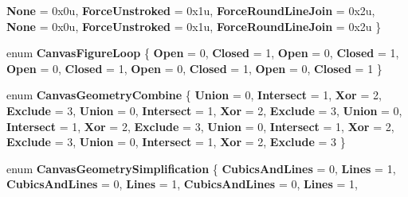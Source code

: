 \begin{DoxyCompactItemize}
{\bfseries None} = 0x0u, 
{\bfseries Force\+Unstroked} = 0x1u, 
{\bfseries Force\+Round\+Line\+Join} = 0x2u, 
\newline
{\bfseries None} = 0x0u, 
{\bfseries Force\+Unstroked} = 0x1u, 
{\bfseries Force\+Round\+Line\+Join} = 0x2u
 \}
\item 
\mbox{\label{namespace_microsoft_1_1_graphics_1_1_canvas_1_1_geometry_a28bf1d65eb419d2a2015efc91bb9741c}} 
enum {\bfseries Canvas\+Figure\+Loop} \{ \newline
{\bfseries Open} = 0, 
{\bfseries Closed} = 1, 
{\bfseries Open} = 0, 
{\bfseries Closed} = 1, 
\newline
{\bfseries Open} = 0, 
{\bfseries Closed} = 1, 
{\bfseries Open} = 0, 
{\bfseries Closed} = 1, 
\newline
{\bfseries Open} = 0, 
{\bfseries Closed} = 1
 \}
\item 
\mbox{\label{namespace_microsoft_1_1_graphics_1_1_canvas_1_1_geometry_a8aee93f6169d213f64028a369522c8bb}} 
enum {\bfseries Canvas\+Geometry\+Combine} \{ \newline
{\bfseries Union} = 0, 
{\bfseries Intersect} = 1, 
{\bfseries Xor} = 2, 
{\bfseries Exclude} = 3, 
\newline
{\bfseries Union} = 0, 
{\bfseries Intersect} = 1, 
{\bfseries Xor} = 2, 
{\bfseries Exclude} = 3, 
\newline
{\bfseries Union} = 0, 
{\bfseries Intersect} = 1, 
{\bfseries Xor} = 2, 
{\bfseries Exclude} = 3, 
\newline
{\bfseries Union} = 0, 
{\bfseries Intersect} = 1, 
{\bfseries Xor} = 2, 
{\bfseries Exclude} = 3, 
\newline
{\bfseries Union} = 0, 
{\bfseries Intersect} = 1, 
{\bfseries Xor} = 2, 
{\bfseries Exclude} = 3
 \}
\item 
\mbox{\label{namespace_microsoft_1_1_graphics_1_1_canvas_1_1_geometry_a2ce59b66d6d8d5be54c22ba03d885c82}} 
enum {\bfseries Canvas\+Geometry\+Simplification} \{ \newline
{\bfseries Cubics\+And\+Lines} = 0, 
{\bfseries Lines} = 1, 
{\bfseries Cubics\+And\+Lines} = 0, 
{\bfseries Lines} = 1, 
\newline
{\bfseries Cubics\+And\+Lines} = 0, 
{\bfseries Lines} = 1, 

\end{DoxyCompactItemize}
